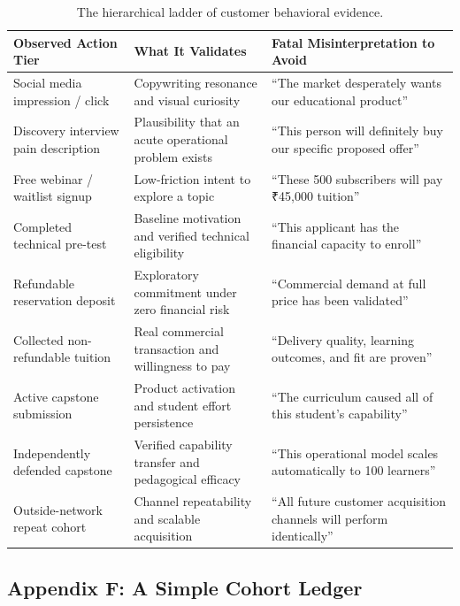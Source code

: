 \begin{table}[t]
\centering
\small
\begin{tabularx}{\textwidth}{>{\raggedright\arraybackslash}p{4cm} >{\raggedright\arraybackslash}X >{\raggedright\arraybackslash}X}
\toprule
\textbf{Observed Action Tier} & \textbf{What It Validates} & \textbf{Fatal Misinterpretation to Avoid} \\
\midrule
Social media impression / click & Copywriting resonance and visual curiosity & ``The market desperately wants our educational product'' \\
Discovery interview pain description & Plausibility that an acute operational problem exists & ``This person will definitely buy our specific proposed offer'' \\
Free webinar / waitlist signup & Low-friction intent to explore a topic & ``These 500 subscribers will pay ₹45,000 tuition'' \\
Completed technical pre-test & Baseline motivation and verified technical eligibility & ``This applicant has the financial capacity to enroll'' \\
Refundable reservation deposit & Exploratory commitment under zero financial risk & ``Commercial demand at full price has been validated'' \\
Collected non-refundable tuition & Real commercial transaction and willingness to pay & ``Delivery quality, learning outcomes, and fit are proven'' \\
Active capstone submission & Product activation and student effort persistence & ``The curriculum caused all of this student's capability'' \\
Independently defended capstone & Verified capability transfer and pedagogical efficacy & ``This operational model scales automatically to 100 learners'' \\
Outside-network repeat cohort & Channel repeatability and scalable acquisition & ``All future customer acquisition channels will perform identically'' \\
\bottomrule
\end{tabularx}
\caption{The hierarchical ladder of customer behavioral evidence.}
\label{tab:ch9-app-evidence-hierarchy}
\end{table}

\subsection*{Appendix F: A Simple Cohort Ledger}

